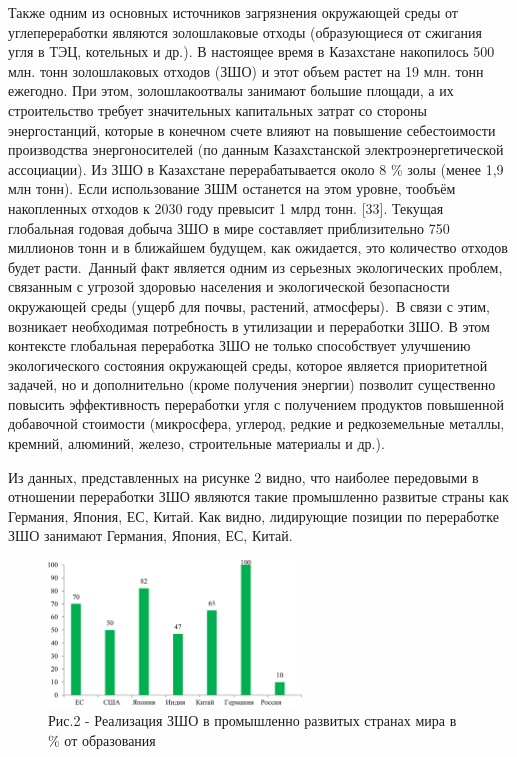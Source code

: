 \begin{multicols}{2}
Также одним из основных источников загрязнения окружающей среды от
углепереработки являются золошлаковые отходы (образующиеся от сжигания
угля в ТЭЦ, котельных и др.). В настоящее время в Казахстане накопилось
500 млн. тонн золошлаковых отходов (ЗШО) и этот объем растет на 19 млн.
тонн ежегодно. При этом, золошлакоотвалы занимают большие площади, а их
строительство требует значительных капитальных затрат со стороны
энергостанций, которые в конечном счете влияют на повышение
себестоимости производства энергоносителей (по данным Казахстанской
электроэнергетической ассоциации). Из ЗШО в Казахстане перерабатывается
около 8 \% золы (менее 1,9 млн тонн). Если использование ЗШМ останется
на этом уровне, тообъём накопленных отходов к 2030 году превысит 1 млрд
тонн. {[}33{]}. Текущая глобальная годовая добыча ЗШО в мире составляет
приблизительно 750 миллионов тонн и в ближайшем будущем, как ожидается,
это количество отходов будет расти.~Данный факт является одним из
серьезных экологических проблем, связанным с угрозой здоровью населения
и экологической безопасности окружающей среды (ущерб для почвы,
растений, атмосферы).~В связи с этим, возникает необходимая потребность
в утилизации и переработки ЗШО. В этом контексте глобальная переработка
ЗШО не только способствует улучшению экологического состояния окружающей
среды, которое является приоритетной задачей, но и дополнительно (кроме
получения энергии) позволит существенно повысить эффективность
переработки угля с получением продуктов повышенной добавочной стоимости
(микросфера, углерод, редкие и редкоземельные металлы, кремний,
алюминий, железо, строительные материалы и др.).

Из данных, представленных на рисунке 2 видно, что наиболее передовыми в
отношении переработки ЗШО являются такие промышленно развитые страны как
Германия, Япония, ЕС, Китай. Как видно, лидирующие позиции по
переработке ЗШО занимают Германия, Япония, ЕС, Китай.
\end{multicols}

\begin{figure}[H]
	\centering
	\includegraphics[width=0.6\textwidth]{media/chem4/image10}
	\caption*{Рис.2 - Реализация ЗШО в промышленно развитых странах мира в \% от образования}
\end{figure}

